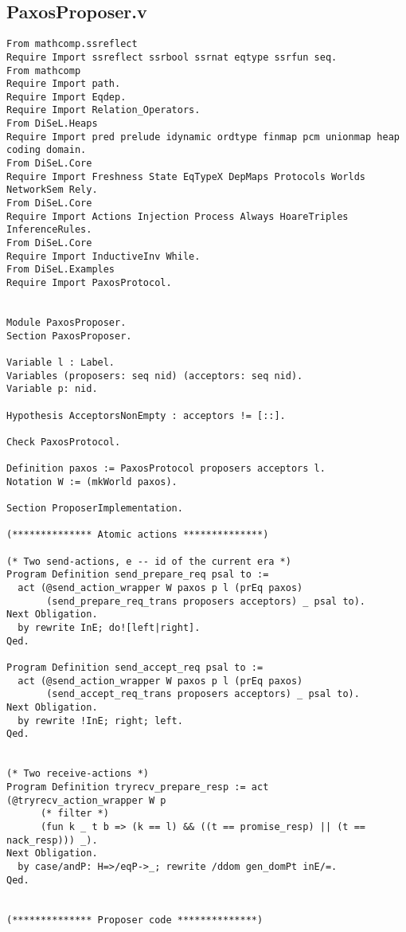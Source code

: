 \begin{landscape}
\newpage

\section{PaxosProposer.v}
\begin{multicols*}{2}
\begin{lstlisting}[style=SourceCodeListing]
From mathcomp.ssreflect
Require Import ssreflect ssrbool ssrnat eqtype ssrfun seq.
From mathcomp
Require Import path.
Require Import Eqdep.
Require Import Relation_Operators.
From DiSeL.Heaps
Require Import pred prelude idynamic ordtype finmap pcm unionmap heap coding domain.
From DiSeL.Core
Require Import Freshness State EqTypeX DepMaps Protocols Worlds NetworkSem Rely.
From DiSeL.Core
Require Import Actions Injection Process Always HoareTriples InferenceRules.
From DiSeL.Core
Require Import InductiveInv While.
From DiSeL.Examples
Require Import PaxosProtocol.


Module PaxosProposer.
Section PaxosProposer.

Variable l : Label.
Variables (proposers: seq nid) (acceptors: seq nid).
Variable p: nid.

Hypothesis AcceptorsNonEmpty : acceptors != [::].

Check PaxosProtocol.

Definition paxos := PaxosProtocol proposers acceptors l.
Notation W := (mkWorld paxos).

Section ProposerImplementation.

(************** Atomic actions **************)

(* Two send-actions, e -- id of the current era *)
Program Definition send_prepare_req psal to :=
  act (@send_action_wrapper W paxos p l (prEq paxos)
       (send_prepare_req_trans proposers acceptors) _ psal to).
Next Obligation.
  by rewrite InE; do![left|right].
Qed.

Program Definition send_accept_req psal to :=
  act (@send_action_wrapper W paxos p l (prEq paxos)
       (send_accept_req_trans proposers acceptors) _ psal to).
Next Obligation.
  by rewrite !InE; right; left.
Qed.


(* Two receive-actions *)
Program Definition tryrecv_prepare_resp := act (@tryrecv_action_wrapper W p
      (* filter *)
      (fun k _ t b => (k == l) && ((t == promise_resp) || (t == nack_resp))) _).
Next Obligation.
  by case/andP: H=>/eqP->_; rewrite /ddom gen_domPt inE/=.
Qed.


(************** Proposer code **************)


\end{lstlisting}
\end{multicols*}
\end{landscape}
